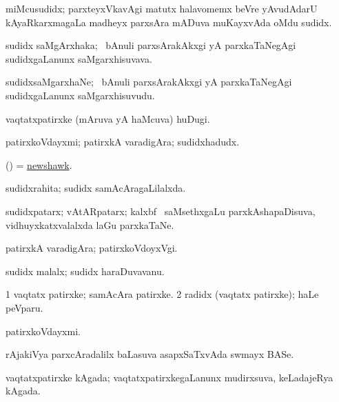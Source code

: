 \bentry
{}
\gl{\nA}
\bmng
miMcusudidx; parxteyxVkavAgi matutx halavomemx beVre yAvudAdarU kAyaRkarxmagaLa madheyx parxsAra mADuva muKayxvAda oMdu sudidx. 
\emng
\eentry

\bentry
{}
\gl{\nA}
\bmng
sudidx saMgArxhaka; \kanmu\ bAnuli parxsArakAkxgi yA parxkaTaNegAgi sudidxgaLanunx saMgarxhisuvava. 
\emng
\eentry

\bentry
{}
\gl{\nA}
\bmng
sudidxsaMgarxhaNe; \kanmu\ bAnuli parxsArakAkxgi yA parxkaTaNegAgi sudidxgaLanunx saMgarxhisuvudu. 
\emng
\eentry

\bentry
{}
\gl{\nA}
\bmng
vaqtatxpatirxke (mAruva yA haMcuva) huDugi. 
\emng
\eentry

\bentry
{}
\gl{\nA}
\bmng
patirxkoVdayxmi; patirxkA varadigAra; sudidxhadudx. 
\emng
\eentry

\bentry
{}
\gl{\nA}
\bmng
(\ame) = \hyperlink{newshawk}{newshawk}. 
\emng
\eentry

\bentry
{}
\gl{\gu}
\bmng
sudidxrahita; sudidx samAcAragaLilalxda. 
\emng
\eentry

\bentry
{}
\gl{\nA}
\bmng
sudidxpatarx; vAtARpatarx; kalxbf \mo\ saMsethxgaLu parxkAshapaDisuva, vidhuyxkatxvalalxda laGu parxkaTaNe. 
\emng
\eentry

\bentry
{}
\gl{\nA}
\bmng
patirxkA varadigAra; patirxkoVdoyxVgi. 
\emng
\eentry

\bentry
{}
\gl{\nA}
\bmng
sudidx malalx; sudidx haraDuvavanu. 
\emng
\eentry

\bentry
{}
\gl{\nA}
\bmng
\bnum
\num{1} vaqtatx patirxke; samAcAra patirxke. 
\num{2} radidx (vaqtatx patirxke); haLe peVparu. 
\enum
\emng
\eentry

\bentry
{}
\gl{\nA}
\bmng
patirxkoVdayxmi. 
\emng
\eentry

\bentry
{}
\gl{\nA}
\bmng
rAjakiVya parxcAradalilx baLasuva asapxSaTxvAda swmayx BASe. 
\emng
\eentry

\bentry
{}
\gl{\nA}
\bmng
vaqtatxpatirxke kAgada; vaqtatxpatirxkegaLanunx mudirxsuva, keLadajeRya kAgada. 
\emng
\eentry


